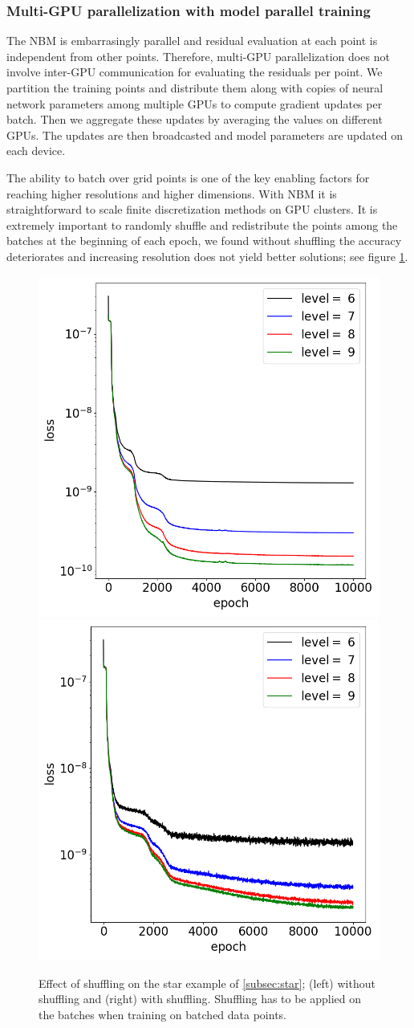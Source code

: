 \documentclass{elsarticle}
\begin{document}
\subsubsection{Multi-GPU parallelization with model parallel training}
The NBM is embarrasingly parallel and residual evaluation at each point is independent from other points. Therefore, multi-GPU parallelization does not involve inter-GPU communication for evaluating the residuals per point. We partition the training points and distribute them along with copies of neural network parameters among multiple GPUs to compute gradient updates per batch. Then we aggregate these updates by averaging the values on different GPUs. The updates are then broadcasted and model parameters are updated on each device.

The ability to batch over grid points is one of the key enabling factors for reaching higher resolutions and higher dimensions. With NBM it is straightforward to scale finite discretization methods on GPU clusters. It is extremely important to randomly shuffle and redistribute the points among the batches at the beginning of each epoch, we found without shuffling the accuracy deteriorates and increasing resolution does not yield better solutions; see figure \ref{fig:batcheffect}.


\begin{figure}
	\centering
	\includegraphics[width=0.45\linewidth]{./figures/poisson_solver_loss_multires_64.png}
	\includegraphics[width=0.45\linewidth]{./figures/poisson_solver_loss_multires_64_shuffled.png}
	\caption{Effect of shuffling on the star example of \ref{subsec:star}; (left) without shuffling and (right) with shuffling. Shuffling has to be applied on the batches when training on batched data points.}
	\label{fig:batcheffect}
\end{figure}
\end{document}
